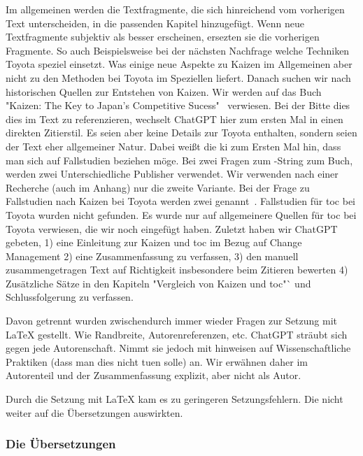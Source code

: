 Im allgemeinen werden die Textfragmente, die sich hinreichend vom vorherigen Text unterscheiden, in die passenden Kapitel hinzugefügt. Wenn neue Textfragmente subjektiv als besser erscheinen, ersezten sie die vorherigen Fragmente. So auch Beispielsweise bei der nächsten Nachfrage welche Techniken Toyota speziel einsetzt. Was einige neue Aspekte zu Kaizen im Allgemeinen aber nicht zu den Methoden bei Toyota im Speziellen liefert.
Danach suchen wir nach historischen Quellen zur Entstehen von Kaizen. Wir werden auf das Buch "Kaizen: The Key to Japan's Competitive Sucess"~\cite{imai1986kaizen} verwiesen. Bei der Bitte dies dies im Text zu referenzieren, wechselt ChatGPT hier zum ersten Mal in einen direkten Zitierstil. Es seien aber keine Details zur Toyota enthalten, sondern seien der Text eher allgemeiner Natur. Dabei weißt die \gls{ki} zum Ersten Mal hin, dass man sich auf Fallstudien beziehen möge. Bei zwei Fragen zum \BibTeX{}-String zum Buch, werden zwei Unterschiedliche Publisher verwendet. Wir verwenden nach einer Recherche (auch im Anhang) nur die zweite Variante. Bei der Frage zu Fallstudien nach Kaizen bei Toyota werden zwei genannt~\cite{ibscmr2003toyotakaizen, casecentre2002toyotakaizen}. Fallstudien für \gls{toc} bei Toyota wurden nicht gefunden. Es wurde nur auf allgemeinere Quellen für \gls{toc} bei Toyota verwiesen, die wir noch eingefügt haben.
Zuletzt haben wir ChatGPT gebeten, 1) eine Einleitung zur Kaizen und \gls{toc} im Bezug auf Change Management 2) eine Zusammenfassung zu verfassen, 3) den manuell zusammengetragen Text auf Richtigkeit insbesondere beim Zitieren  bewerten 4) Zusätzliche Sätze in den Kapiteln "Vergleich von Kaizen und \gls{toc}"` und Schlussfolgerung zu verfassen.

Davon getrennt wurden zwischendurch immer wieder Fragen zur Setzung mit \LaTeX{} gestellt. Wie Randbreite, Autorenreferenzen, etc. ChatGPT sträubt sich gegen jede Autorenschaft. Nimmt sie jedoch mit hinweisen auf Wissenschaftliche Praktiken (dass man dies nicht tuen solle) an. Wir erwähnen daher im Autorenteil und der Zusammenfassung explizit, aber nicht als Autor.

Durch die Setzung mit \LaTeX{} kam es zu geringeren Setzungsfehlern. Die nicht weiter auf die Übersetzungen auswirkten.

\subsubsection{Die Übersetzungen}

